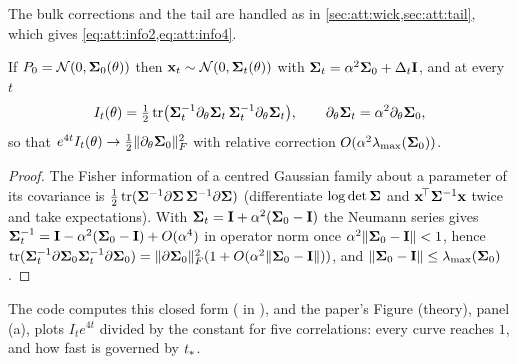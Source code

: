 The bulk corrections and the tail are handled as in \cref{sec:att:wick,sec:att:tail},
which gives \cref{eq:att:info2,eq:att:info4}.

\begin{proposition}
\label{prop:att:gaussinfo}
If $P_0=\mathcal{N}\!\left(0,\mathbf{\Sigma}_0(\theta)\right)$ then $\mathbf{x}_t\sim\mathcal{N}\!\left(0,\mathbf{\Sigma}_t(\theta)\right)$ with
$\mathbf{\Sigma}_t=\alpha^2\mathbf{\Sigma}_0+\Delta_t\mathbf{I}$, and at every $t$
\[
  I_t(\theta)=\tfrac12\operatorname{tr}\bigl(\mathbf{\Sigma}_t^{-1}\partial_\theta\mathbf{\Sigma}_t\,\mathbf{\Sigma}_t^{-1}\partial_\theta\mathbf{\Sigma}_t\bigr),\qquad
  \partial_\theta\mathbf{\Sigma}_t=\alpha^2\partial_\theta\mathbf{\Sigma}_0,
\]
so that $e^{4t}I_t(\theta)\to\tfrac12\lVert \partial_\theta\mathbf{\Sigma}_0 \rVert_{F}^2$ with relative
correction $O(\alpha^2\lambda_{\max}(\mathbf{\Sigma}_0))$.
\end{proposition}

\begin{proof}
The Fisher information of a centred Gaussian family about a parameter of its
covariance is $\tfrac12\operatorname{tr}(\mathbf{\Sigma}^{-1}\partial\mathbf{\Sigma}\,\mathbf{\Sigma}^{-1}\partial\mathbf{\Sigma})$ (differentiate
$\log\det\mathbf{\Sigma}$ and $\mathbf{x}^{\!\top}\mathbf{\Sigma}^{-1}\mathbf{x}$ twice and take expectations). With
$\mathbf{\Sigma}_t=\mathbf{I}+\alpha^2(\mathbf{\Sigma}_0-\mathbf{I})$ the Neumann series gives $\mathbf{\Sigma}_t^{-1}=\mathbf{I}-\alpha^2(\mathbf{\Sigma}_0-\mathbf{I})+O(\alpha^4)$
in operator norm once $\alpha^2\lVert\mathbf{\Sigma}_0-\mathbf{I}\rVert<1$, hence
$\operatorname{tr}(\mathbf{\Sigma}_t^{-1}\partial\mathbf{\Sigma}_0\mathbf{\Sigma}_t^{-1}\partial\mathbf{\Sigma}_0)=\lVert \partial\mathbf{\Sigma}_0 \rVert_{F}^2(1+O(\alpha^2\lVert\mathbf{\Sigma}_0-\mathbf{I}\rVert))$,
and $\lVert\mathbf{\Sigma}_0-\mathbf{I}\rVert\le\lambda_{\max}(\mathbf{\Sigma}_0)$.
\end{proof}

The code computes this closed form ( in
), and the paper's Figure (theory), panel (a), plots
$I_t e^{4t}$ divided by the constant for five correlations: every curve reaches $1$,
and how fast is governed by $t_{*}$.

